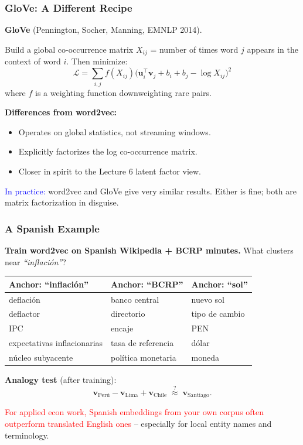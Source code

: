 \documentclass[notes,11pt, aspectratio=169]{beamer}
\newcommand{\vu}{\mathbf{u}}
\newcommand{\vv}{\mathbf{v}}
\begin{document}
\begin{frame}
\frametitle{GloVe: A Different Recipe}

\textbf{GloVe} (Pennington, Socher, Manning, EMNLP 2014).

\vspace{4pt}
Build a global co-occurrence matrix $X_{ij}$ = number of times word $j$ appears in the context of word $i$. Then minimize:
\[
    \mathcal{L} = \sum_{i,j} f(X_{ij}) \bigl(\vu_i^\top \vv_j + b_i + b_j - \log X_{ij}\bigr)^2
\]
where $f$ is a weighting function downweighting rare pairs.

\vspace{8pt}
\textbf{Differences from word2vec:}
\begin{itemize}
    \item Operates on global statistics, not streaming windows.
    \item Explicitly factorizes the log co-occurrence matrix.
    \item Closer in spirit to the Lecture 6 latent factor view.
\end{itemize}

\vspace{8pt}
\textcolor{blue}{In practice:} word2vec and GloVe give very similar results. Either is fine; both are matrix factorization in disguise.
\end{frame}

\begin{frame}
\frametitle{A Spanish Example}

\textbf{Train word2vec on Spanish Wikipedia + BCRP minutes.} What clusters near \textit{``inflaci\'on''}?

\vspace{4pt}
\begin{center}
\renewcommand{\arraystretch}{1.2}
\small
\begin{tabular}{p{4.5cm} p{4.5cm} p{4.5cm}}
\toprule
\textbf{Anchor: ``inflaci\'on''} & \textbf{Anchor: ``BCRP''} & \textbf{Anchor: ``sol''} \\
\midrule
deflaci\'on & banco central & nuevo sol \\
deflactor & directorio & tipo de cambio \\
IPC & encaje & PEN \\
expectativas inflacionarias & tasa de referencia & d\'olar \\
n\'ucleo subyacente & pol\'itica monetaria & moneda \\
\bottomrule
\end{tabular}
\end{center}

\vspace{8pt}
\textbf{Analogy test} (after training):
\[
    \vv_{\text{Per\'u}} - \vv_{\text{Lima}} + \vv_{\text{Chile}} \;\stackrel{?}{\approx}\; \vv_{\text{Santiago}}.
\]

\vspace{6pt}
\textcolor{red}{For applied econ work, Spanish embeddings from your own corpus often outperform translated English ones} -- especially for local entity names and terminology.
\end{frame}
\end{document}

